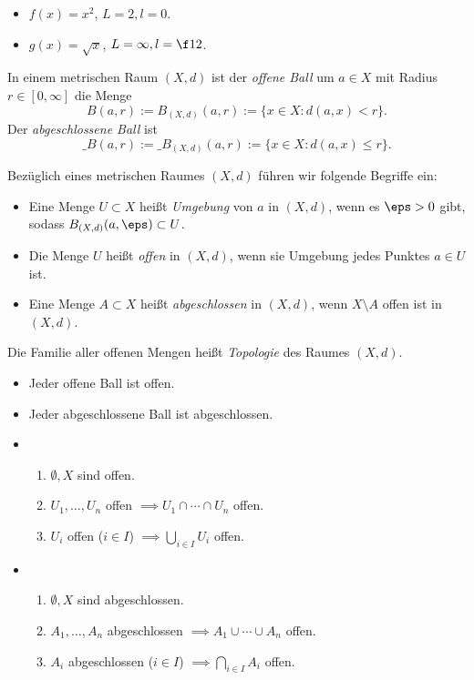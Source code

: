 \begin{ex}
	\begin{itemize}
		\item
			$f(x) = x^2$, $L=2, l=0$.
		\item
			$g(x) = \sqrt{x}$, $L=\infty, l=\f 12$.
	\end{itemize}
\end{ex}

\begin{df}
	In einem metrischen Raum $(X,d)$ ist der \emph{offene Ball} um $a \in X$ mit Radius $r\in [0,\infty]$ die Menge
	\[
		B(a,r) := B_{(X,d)}(a, r) := \{ x \in X : d(a,x) < r \}.
	\]
	Der \emph{abgeschlossene Ball} ist
	\[
		\_{B}(a,r) := \_{B}_{(X,d)}(a, r) := \{ x \in X : d(a,x) \le r \}.
	\]
\end{df}

\begin{df} \label{df:metric_space_terms}
	Bezüglich eines metrischen Raumes $(X,d)$ führen wir folgende Begriffe ein:
	\begin{itemize}
		\item
			Eine Menge $U \subset X$ heißt \emph{Umgebung} von $a$ in $(X,d)$, wenn es $\eps > 0$ gibt, sodass $B_{(X,d)}(a,\eps) \subset U$.
		\item
			Die Menge $U$ heißt \emph{offen} in $(X,d)$, wenn sie Umgebung jedes Punktes $a \in U$ ist.
		\item
			Eine Menge $A \subset X$ heißt \emph{abgeschlossen} in $(X,d)$, wenn $X \setminus A$ offen ist in $(X,d)$.
	\end{itemize}

	Die Familie aller offenen Mengen heißt \emph{Topologie} des Raumes $(X,d)$.
\end{df}

\begin{prop}
	\begin{itemize}
		\item
			Jeder offene Ball ist offen.
		\item
			Jeder abgeschlossene Ball ist abgeschlossen.
		\item
			\begin{enumerate}[({O}1)]
				\item
					$\emptyset, X$ sind offen.
				\item
					$U_1,\dotsc,U_n$ offen $\implies U_1 \cap \dotsb \cap U_n$ offen.
				\item
					$U_i$ offen ($i\in I$) $\implies \bigcup_{i\in I} U_i$ offen.
			\end{enumerate}
		\item
			\begin{enumerate}[({A}1)]
				\item
					$\emptyset, X$ sind abgeschlossen.
				\item
					$A_1,\dotsc,A_n$ abgeschlossen $\implies A_1 \cup \dotsb \cup A_n$ offen.
				\item
					$A_i$ abgeschlossen ($i\in I$) $\implies \bigcap_{i\in I} A_i$ offen.
			\end{enumerate}
	\end{itemize}
\end{prop}

